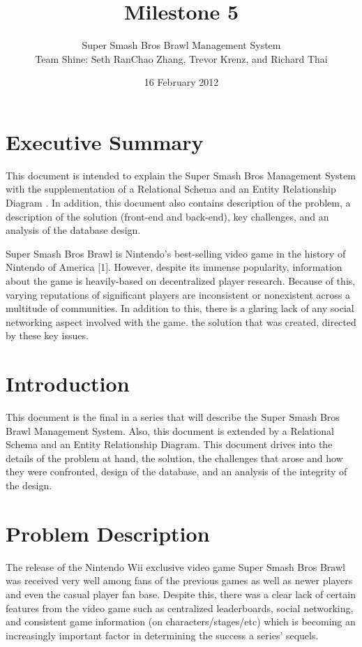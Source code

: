 \documentclass{article}
\begin{document}
\setlength{\voffset}{3.5in}
\title{Milestone 5}
\author{Super Smash Bros Brawl Management System \\
Team Shine: Seth RanChao Zhang, Trevor Krenz, and Richard Thai}
\date{16 February 2012}
\maketitle
\clearpage
\setlength{\voffset}{0pt}
\tableofcontents
\clearpage
\section{Executive Summary}
This document is intended to explain the Super Smash Bros Management System \label{ssbb} with the supplementation of a Relational Schema and an Entity Relationship Diagram \label{erd}.  In addition, this document also contains description of the problem, a description of the solution (front-end and back-end), key challenges, and an analysis of the database design.

Super Smash Bros Brawl is Nintendo's best-selling video game in the history of Nintendo of America [1].  However, despite its immense popularity, information about the game is heavily-based on decentralized player research.  Because of this, varying reputations of significant players are inconsistent or nonexistent across a multitude of communities.  In addition to this, there is a glaring lack of any social networking aspect involved with the game.  the solution that was created, directed by these key issues.

\section{Introduction}
This document is the final in a series that will describe the Super Smash Bros Brawl Management System.  Also, this document is extended by a Relational Schema and an Entity Relationship Diagram.  This document drives into the details of the problem at hand, the solution, the challenges that arose and how they were confronted, design of the database, and an analysis of the integrity of the design.

\section{Problem Description}
The release of the Nintendo Wii\label{nwii} exclusive video game Super Smash Bros Brawl was received very well among fans of the previous games as well as newer players and even the casual player fan base.  Despite this, there was a clear lack of certain features from the video game such as centralized leaderboards, social networking, and consistent game information (on characters/stages/etc) which is becoming an increasingly important factor in determining the success a series' sequels.
\end{document}
